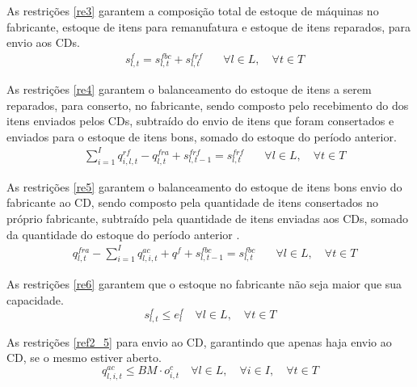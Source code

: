 As restrições \ref{re3} garantem a composição total de estoque de máquinas no fabricante, estoque de itens para remanufatura e estoque de itens reparados, para envio aos CDs.
\begin{equation}\label{re3}
\begin{aligned}
& s^{f}_{l,t} = s^{fbc}_{l,t} + s^{frf}_{l,t} \quad & \forall l \in L, \quad \forall t \in T
\end{aligned}
\end{equation}

As restrições \ref{re4} garantem o balanceamento do estoque de itens a serem reparados, para conserto, no fabricante, sendo composto pelo recebimento do dos itens enviados pelos CDs, subtraído do envio de itens que foram consertados e enviados para o estoque de itens bons, somado do estoque do período anterior.
\begin{equation}\label{re4}
\begin{aligned}
& \sum_{i=1}^{I} q^{rf}_{i,l,t} - q^{fra}_{l,t} + s^{frf}_{l, t-1} = s^{frf}_{l, t} \quad & \forall l \in L, \quad \forall t \in T
\end{aligned}
\end{equation}

As restrições \ref{re5} garantem o balanceamento do estoque de itens bons envio do fabricante ao CD, sendo composto pela quantidade de itens consertados no próprio fabricante, subtraído pela quantidade de itens enviadas aos CDs, somado da quantidade do estoque do período anterior .
\begin{equation}\label{re5}
\begin{aligned}
& q^{fra}_{l,t} - \sum_{i=1}^{I} q^{ac}_{l,i,t} + q^{f} + s^{fbc}_{l, t-1} = s^{fbc}_{l, t} \quad & \forall l \in L, \quad \forall t \in T
\end{aligned}
\end{equation}

As restrições \ref{re6} garantem que o estoque no fabricante não seja maior que sua capacidade.
\begin{equation}\label{re6}
s^{f}_{l,t} \leq e^{f}_{l} \quad \forall l \in L, \quad \forall t \in T
\end{equation}

As restrições \ref{ref2_5}  para envio ao CD, garantindo que apenas haja envio ao CD, se o mesmo estiver aberto.
\begin{equation}\label{ref2_5}
q^{ac}_{l,i,t} \leq BM \cdot o^{c}_{i, t} \quad \forall l \in L, \quad \forall i \in I, \quad \forall t \in T
\end{equation}


